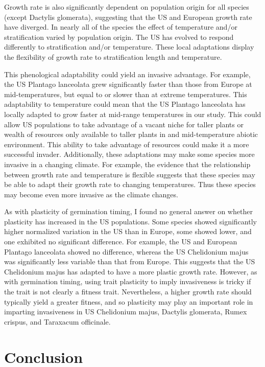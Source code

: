 \documentclass[12pt]{article}\usepackage[]{graphicx}\usepackage[]{color}
\begin{document}
	
	Growth rate is also significantly dependent on population origin for all species (except Dactylis glomerata), suggesting that the US and European growth rate have diverged. In nearly all of the species the effect of temperature and/or stratification varied by population origin. The US has evolved to respond differently to stratification and/or temperature. These local adaptations display the flexibility of growth rate to stratification length and temperature. 
	
	This phenological adaptability could yield an invasive advantage. For example, the US Plantago lanceolata grew significantly faster than those from Europe at mid-temperatures, but equal to or slower than at extreme temperatures. This adaptability to temperature could mean that the US Plantago lanceolata has locally adapted to grow faster at mid-range temperatures in our study. This could allow US populations to take advantage of a vacant niche for taller plants or wealth of resources only available to taller plants in and mid-temperature abiotic environment. This ability to take advantage of resources could make it a more successful invader. Additionally, these adaptations may make some species more invasive in a changing climate. For example, the evidence that the relationship between growth rate and temperature is flexible suggests that these species may be able to adapt their growth rate to changing temperatures. Thus these species may become even more invasive as the climate changes.
	
	As with plasticity of germination timing, I found no general answer on whether plasticity has increased in the US populations. Some species showed significantly higher normalized variation in the US than in Europe, some showed lower, and one exhibited no significant difference. For example, the US and European Plantago lanceolata showed no difference, whereas the US Chelidonium majus was significantly less variable than that from Europe. This suggests that the US Chelidonium majus has adapted to have a more plastic growth rate. However, as with germination timing, using trait plasticity to imply invasiveness is tricky if the trait is not clearly a fitness trait.  Nevertheless, a higher growth rate should typically yield a greater fitness, and so plasticity may play an important role in imparting invasiveness in US Chelidonium majus, Dactylis glomerata, Rumex crispus, and Taraxacum officinale.  
	
	
	\section{Conclusion}
	
\end{document}
